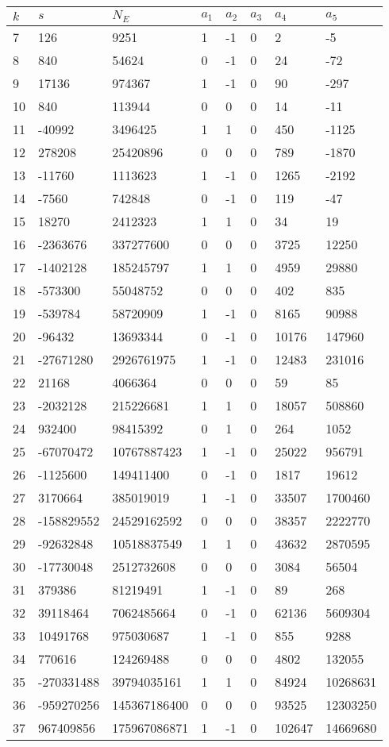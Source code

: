 \documentclass{amsart}
\begin{document}
\begin{longtable}{|l|l|l|lllll|}
\hline
$k$ & $s$ & $N_E$ & $a_1$ & $a_2$ & $a_3$ & $a_4$ & $a_5$\\
\hline
7&126&9251&1&-1&0&2&-5\\
8&840&54624&0&-1&0&24&-72\\
9&17136&974367&1&-1&0&90&-297\\
10&840&113944&0&0&0&14&-11\\
11&-40992&3496425&1&1&0&450&-1125\\
12&278208&25420896&0&0&0&789&-1870\\
13&-11760&1113623&1&-1&0&1265&-2192\\
14&-7560&742848&0&-1&0&119&-47\\
15&18270&2412323&1&1&0&34&19\\
16&-2363676&337277600&0&0&0&3725&12250\\
17&-1402128&185245797&1&1&0&4959&29880\\
18&-573300&55048752&0&0&0&402&835\\
19&-539784&58720909&1&-1&0&8165&90988\\
20&-96432&13693344&0&-1&0&10176&147960\\
21&-27671280&2926761975&1&-1&0&12483&231016\\
22&21168&4066364&0&0&0&59&85\\
23&-2032128&215226681&1&1&0&18057&508860\\
24&932400&98415392&0&1&0&264&1052\\
25&-67070472&10767887423&1&-1&0&25022&956791\\
26&-1125600&149411400&0&-1&0&1817&19612\\
27&3170664&385019019&1&-1&0&33507&1700460\\
28&-158829552&24529162592&0&0&0&38357&2222770\\
29&-92632848&10518837549&1&1&0&43632&2870595\\
30&-17730048&2512732608&0&0&0&3084&56504\\
31&379386&81219491&1&-1&0&89&268\\
32&39118464&7062485664&0&-1&0&62136&5609304\\
33&10491768&975030687&1&-1&0&855&9288\\
34&770616&124269488&0&0&0&4802&132055\\
35&-270331488&39794035161&1&1&0&84924&10268631\\
36&-959270256&145367186400&0&0&0&93525&12303250\\
37&967409856&175967086871&1&-1&0&102647&14669680\\

\end{longtable}
\end{document}
